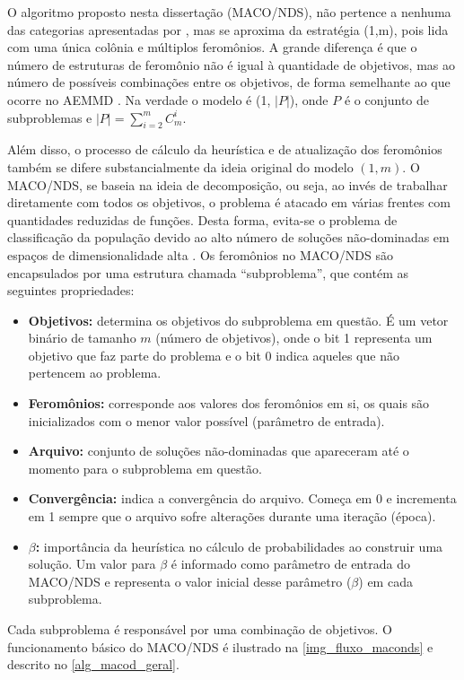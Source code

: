O algoritmo proposto nesta dissertação (MACO/NDS), não pertence a nenhuma das categorias apresentadas por \cite{Alaya2007}, mas se aproxima da estratégia (1,m), pois lida com uma única colônia e múltiplos feromônios. A grande diferença é que o número de estruturas de feromônio não é igual à quantidade de objetivos, mas ao número de possíveis combinações entre os objetivos, de forma semelhante ao que ocorre no AEMMD \cite{Lafeta2017}. Na verdade o modelo é (1, $|P|$), onde $P$ é o conjunto de subproblemas e $|P| = \sum_{i = 2}^m C_m^i$.

Além disso, o processo de cálculo da heurística e de atualização dos feromônios também se difere substancialmente da ideia original do modelo $(1,m)$. O MACO/NDS, se baseia na ideia de decomposição, ou seja, ao invés de trabalhar diretamente com todos os objetivos, o problema é atacado em várias frentes com quantidades reduzidas de funções. Desta forma, evita-se o problema de classificação da população devido ao alto número de soluções não-dominadas em espaços de dimensionalidade alta \cite{Deb2014}. Os feromônios no MACO/NDS são encapsulados por uma estrutura chamada ``subproblema'', que contém as seguintes propriedades: 

\begin{itemize}
	\item \textbf{Objetivos:} determina os objetivos do subproblema em questão. É um vetor binário de tamanho $m$ (número de objetivos), onde o bit 1 representa um objetivo que faz parte do problema e o bit 0 indica aqueles que não pertencem ao problema.
	\item \textbf{Feromônios:} corresponde aos valores dos feromônios em si, os quais são inicializados com o menor valor possível (parâmetro de entrada).
	\item \textbf{Arquivo:} conjunto de soluções não-dominadas que apareceram até o momento para o subproblema em questão.
	\item \textbf{Convergência:} indica a convergência do arquivo. Começa em 0 e incrementa em 1 sempre que o arquivo sofre alterações durante uma iteração (época).
	\item \textbf{$\beta$:} importância da heurística no cálculo de probabilidades ao construir uma solução. Um valor para $\beta$ é informado como parâmetro de entrada do MACO/NDS e representa o valor inicial desse parâmetro ($\beta$) em cada subproblema.
\end{itemize}

Cada subproblema é responsável por uma combinação de objetivos. O funcionamento básico do MACO/NDS é ilustrado na \autoref{img_fluxo_maconds} e descrito no \ref{alg_macod_geral}.

